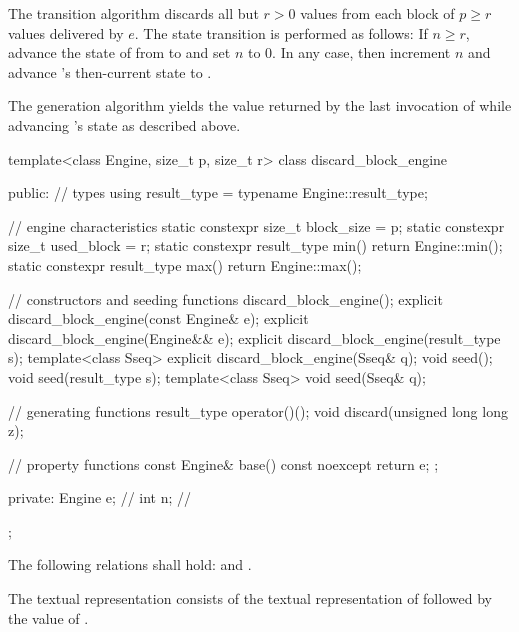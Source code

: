 \pnum
The transition algorithm%
%
discards all but $r > 0$ values
from each block of $p \geq r$ values delivered by $e$.
The state transition is performed as follows:
If $n \geq r$,
 advance the state of  from  to 
 and set $n$ to $0$.
In any case,
 then increment $n$
 and advance 's then-current state 
 to .

\pnum
The generation algorithm%
%
yields the value returned by the last invocation of 
 while advancing 's state as described above.

%
\begin{codeblock}
template<class Engine, size_t p, size_t r>
  class discard_block_engine {
  public:
    // types
    using result_type = typename Engine::result_type;

    // engine characteristics
    static constexpr size_t block_size = p;
    static constexpr size_t used_block = r;
    static constexpr result_type min() { return Engine::min(); }
    static constexpr result_type max() { return Engine::max(); }

    // constructors and seeding functions
    discard_block_engine();
    explicit discard_block_engine(const Engine& e);
    explicit discard_block_engine(Engine&& e);
    explicit discard_block_engine(result_type s);
    template<class Sseq> explicit discard_block_engine(Sseq& q);
    void seed();
    void seed(result_type s);
    template<class Sseq> void seed(Sseq& q);

    // generating functions
    result_type operator()();
    void discard(unsigned long long z);

    // property functions
    const Engine& base() const noexcept { return e; };

  private:
    Engine e;   // \expos
    int n;      // \expos
  };
\end{codeblock}

\pnum
The following relations shall hold:
and
  .

\pnum
The textual representation%
%
consists of
 the textual representation of 
followed by
 the value of .

